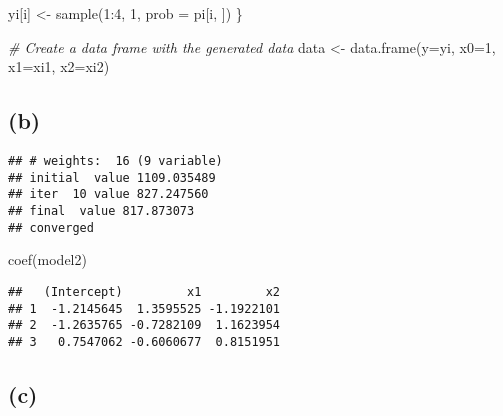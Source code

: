 \documentclass[
]{article}
\newenvironment{Shaded}{\begin{snugshade}}{\end{snugshade}}
\newcommand{\AttributeTok}[1]{\textcolor[rgb]{0.77,0.63,0.00}{#1}}
\newcommand{\CommentTok}[1]{\textcolor[rgb]{0.56,0.35,0.01}{\textit{#1}}}
\newcommand{\DecValTok}[1]{\textcolor[rgb]{0.00,0.00,0.81}{#1}}
\newcommand{\FunctionTok}[1]{\textcolor[rgb]{0.00,0.00,0.00}{#1}}
\newcommand{\NormalTok}[1]{#1}
\newcommand{\OtherTok}[1]{\textcolor[rgb]{0.56,0.35,0.01}{#1}}
\newcommand{\SpecialCharTok}[1]{\textcolor[rgb]{0.00,0.00,0.00}{#1}}
\begin{document}
\begin{Shaded}
\begin{Highlighting}[]
\NormalTok{  yi[i] }\OtherTok{\textless{}{-}} \FunctionTok{sample}\NormalTok{(}\DecValTok{1}\SpecialCharTok{:}\DecValTok{4}\NormalTok{, }\DecValTok{1}\NormalTok{, }\AttributeTok{prob =}\NormalTok{ pi[i, ])}
\NormalTok{\}}

\CommentTok{\# Create a data frame with the generated data}
\NormalTok{data }\OtherTok{\textless{}{-}} \FunctionTok{data.frame}\NormalTok{(}\AttributeTok{y=}\NormalTok{yi, }\AttributeTok{x0=}\DecValTok{1}\NormalTok{, }\AttributeTok{x1=}\NormalTok{xi1, }\AttributeTok{x2=}\NormalTok{xi2)}
\end{Highlighting}
\end{Shaded}

\hypertarget{b-1}{%
\subsection{(b)}\label{b-1}}

\begin{Shaded}
\end{Shaded}

\begin{verbatim}
## # weights:  16 (9 variable)
## initial  value 1109.035489 
## iter  10 value 827.247560
## final  value 817.873073 
## converged
\end{verbatim}

\begin{Shaded}
\begin{Highlighting}[]
\FunctionTok{coef}\NormalTok{(model2)}
\end{Highlighting}
\end{Shaded}

\begin{verbatim}
##   (Intercept)         x1         x2
## 1  -1.2145645  1.3595525 -1.1922101
## 2  -1.2635765 -0.7282109  1.1623954
## 3   0.7547062 -0.6060677  0.8151951
\end{verbatim}

\hypertarget{c-1}{%
\subsection{(c)}\label{c-1}}
\end{document}
